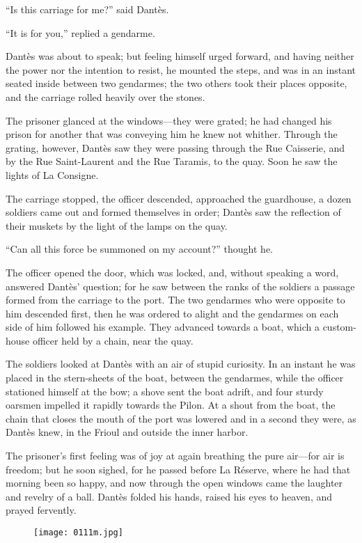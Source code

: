 “Is this carriage for me?” said Dantès.

“It is for you,” replied a gendarme.

Dantès was about to speak; but feeling himself urged forward, and
having neither the power nor the intention to resist, he mounted the
steps, and was in an instant seated inside between two gendarmes; the
two others took their places opposite, and the carriage rolled heavily
over the stones.

The prisoner glanced at the windows—they were grated; he had changed
his prison for another that was conveying him he knew not whither.
Through the grating, however, Dantès saw they were passing through the
Rue Caisserie, and by the Rue Saint-Laurent and the Rue Taramis, to the
quay. Soon he saw the lights of La Consigne.

The carriage stopped, the officer descended, approached the guardhouse,
a dozen soldiers came out and formed themselves in order; Dantès saw
the reflection of their muskets by the light of the lamps on the quay.

“Can all this force be summoned on my account?” thought he.

The officer opened the door, which was locked, and, without speaking a
word, answered Dantès’ question; for he saw between the ranks of the
soldiers a passage formed from the carriage to the port. The two
gendarmes who were opposite to him descended first, then he was ordered
to alight and the gendarmes on each side of him followed his example.
They advanced towards a boat, which a custom-house officer held by a
chain, near the quay.

The soldiers looked at Dantès with an air of stupid curiosity. In an
instant he was placed in the stern-sheets of the boat, between the
gendarmes, while the officer stationed himself at the bow; a shove sent
the boat adrift, and four sturdy oarsmen impelled it rapidly towards
the Pilon. At a shout from the boat, the chain that closes the mouth of
the port was lowered and in a second they were, as Dantès knew, in the
Frioul and outside the inner harbor.

The prisoner’s first feeling was of joy at again breathing the pure
air—for air is freedom; but he soon sighed, for he passed before La
Réserve, where he had that morning been so happy, and now through the
open windows came the laughter and revelry of a ball. Dantès folded his
hands, raised his eyes to heaven, and prayed fervently.

\begin{figure}[h]
\texttt{[image: 0111m.jpg]}
\end{figure}

